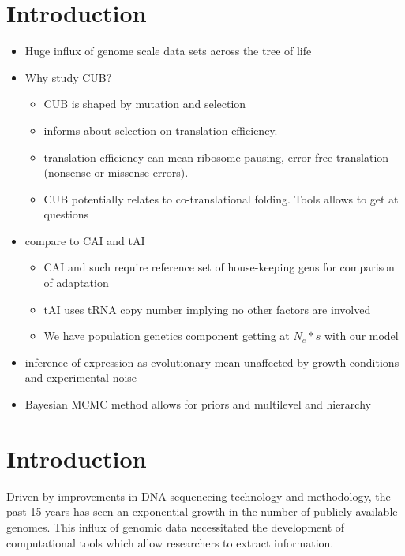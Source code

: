 \documentclass[12pt,draft]{article}
\begin{document}
\doublespacing
\linenumbers


\section*{Introduction}

\begin{itemize}
\item Huge influx of genome scale data sets across the tree of life
\item Why study CUB?
	\begin{itemize}
	\item CUB is shaped by mutation and selection
	\item informs about selection on translation efficiency.
	\item translation efficiency can mean ribosome pausing, error free translation (nonsense or missense errors).
	\item CUB potentially relates to co-translational folding. Tools allows to get at questions
	\end{itemize}
\item compare to CAI and tAI
	\begin{itemize}
	\item CAI and such require reference set of house-keeping gens for comparison of adaptation
	\item tAI uses tRNA copy number implying no other factors are involved
	\item We have population genetics component getting at $N_e * s$ with our model
	\end{itemize}
\item inference of expression as evolutionary mean unaffected by growth conditions and experimental noise
\item Bayesian MCMC method allows for priors and multilevel and hierarchy 
\end{itemize}

\section*{Introduction}
Driven by improvements in DNA sequenceing technology and methodology, the past 15 years has seen an exponential growth in the number of publicly available genomes. 
This influx of genomic data necessitated the development of computational tools which allow researchers to extract information.
\end{document}
